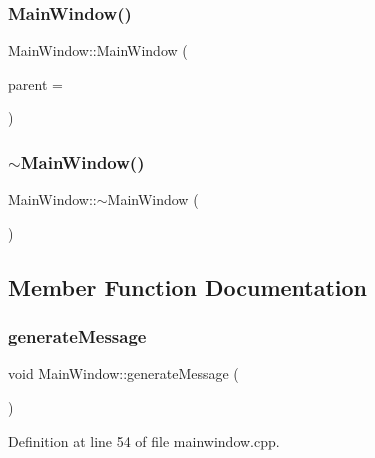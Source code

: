 \subsubsection{Main\+Window()\hspace{0.1cm}{\footnotesize\ttfamily [2/2]}}
{\footnotesize\ttfamily Main\+Window\+::\+Main\+Window (\begin{DoxyParamCaption}\item[{Q\+Widget $\ast$}]{parent = {} }\end{DoxyParamCaption})\hspace{0.3cm}{\ttfamily [explicit]}}

\mbox{\label{class_main_window_ae98d00a93bc118200eeef9f9bba1dba7}} 
\subsubsection{$\sim$\+Main\+Window()\hspace{0.1cm}{\footnotesize\ttfamily [2/2]}}
{\footnotesize\ttfamily Main\+Window\+::$\sim$\+Main\+Window (\begin{DoxyParamCaption}{ }\end{DoxyParamCaption})}



\subsection{Member Function Documentation}
\mbox{\label{class_main_window_a0cc6d93e4c5ce3e9c4af7f9ba485c34c}} 
\subsubsection{generate\+Message}
{\footnotesize\ttfamily void Main\+Window\+::generate\+Message (\begin{DoxyParamCaption}{ }\end{DoxyParamCaption})\hspace{0.3cm}{\ttfamily [slot]}}



Definition at line 54 of file mainwindow.\+cpp.

\mbox{\label{class_main_window_a83864235c4e3def3355d438ffa6f93bd}} 
